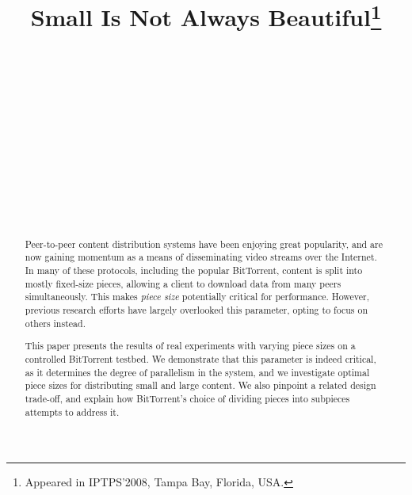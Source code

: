 \documentclass[twocolumn,letterpaper,11pt]{article}
\begin{document}
\title{\textbf{Small Is Not Always Beautiful\footnote{Appeared in IPTPS'2008, Tampa Bay, Florida, USA.}}}

\author{
\alignauthor 
  \\
  \\
\alignauthor 
  \\
  \\
  \\
\alignauthor 
  \\
  \\
  \\
\alignauthor 
  \\
  \\
  \\
}

\date{}  
\maketitle

\pagestyle{empty}

\begin{abstract}

Peer-to-peer content distribution systems have been enjoying great popularity,
and are now gaining momentum as a means of disseminating video streams 
over the Internet. 
In many of these protocols, including the popular BitTorrent, content is 
split into mostly fixed-size pieces, allowing 
a client to download data from many peers simultaneously.
This makes \textit{piece size} potentially critical for performance.
However, previous research efforts have largely overlooked this parameter, opting 
to focus on others instead.

This paper presents the results of real experiments with varying piece 
sizes on a controlled BitTorrent testbed.
We demonstrate that this parameter is indeed critical, as it determines the degree 
of parallelism in the system, and we investigate optimal piece sizes for
distributing small and large content. We also pinpoint a related design trade-off,
and explain how BitTorrent's choice of dividing pieces into subpieces 
attempts to address it.

\end{abstract}
\end{document}
